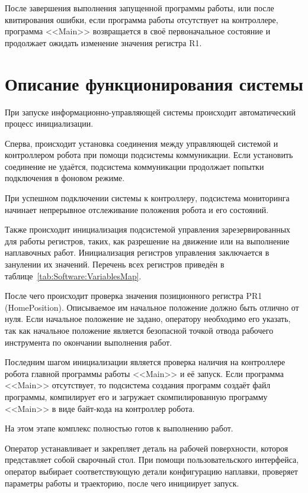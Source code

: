 После завершения выполнения запущенной программы работы, или после квитирования ошибки, если программа работы отсутствует на контроллере, программа <<Main>> возвращается в своё первоначальное состояние и продолжает ожидать изменение значения регистра R1.


\section{Описание функционирования системы}
При запуске информационно-управляющей системы происходит автоматический процесс инициализации.

Сперва, происходит установка соединения между управляющей системой и контроллером робота при помощи подсистемы коммуникации.
Если установить соединение не удаётся, подсистема коммуникации продолжает попытки подключения в фоновом режиме.

При успешном подключении системы к контроллеру, подсистема мониторинга начинает непрерывное отслеживание положения робота и его состояний.

Также происходит инициализация подсистемой управления зарезервированных для работы регистров, таких, как разрешение на движение или на выполнение наплавочных работ.
Инициализация регистров управления заключается в занулении их значений.
Перечень всех регистров приведён в таблице~\ref{tab:Software:VariablesMap}.

После чего происходит проверка значения позиционного регистра PR1 (HomePosition).
Описываемое им начальное положение должно быть отлично от нуля.
Если начальное положение не задано, оператору необходимо его указать, так как начальное положение является безопасной точкой отвода рабочего инструмента по окончании выполнения работ.

Последним шагом инициализации является проверка наличия на контроллере робота главной программы работы <<Main>> и её запуск.
Если программа <<Main>> отсутствует, то подсистема создания программ создаёт файл программы, компилирует его и загружает скомпилированную программу <<Main>> в виде байт-кода на контроллер робота.

На этом этапе комплекс полностью готов к выполнению работ.

Оператор устанавливает и закрепляет деталь на рабочей поверхности, котороя представляет собой сварочный стол.
При помощи пользовательского интерфейса, оператор выбирает соответствующую детали конфигурацию наплавки, проверяет параметры работы и траекторию, после чего инициирует запуск.

